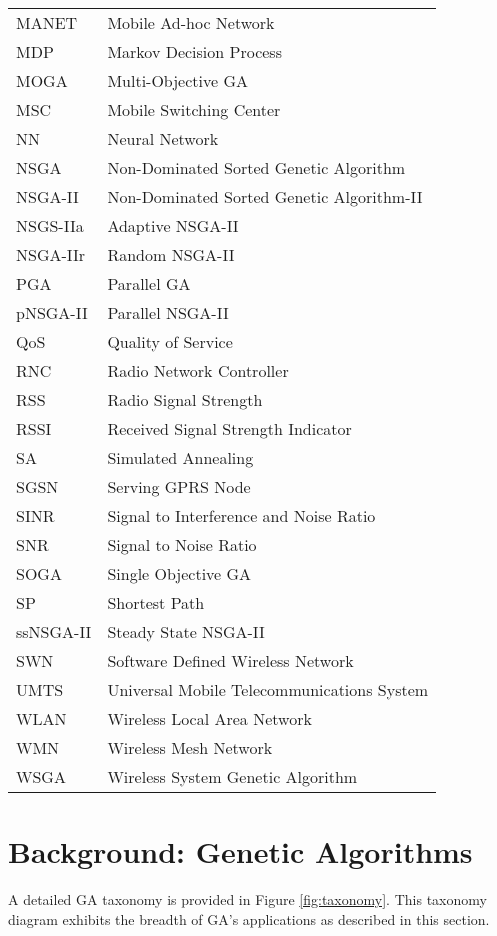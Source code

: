 \documentclass[journal]{IEEEtran}
\begin{document}
\begin{table}
\begin{tabular}{p{1.3cm}p{5.3cm}}
MANET   &   Mobile Ad-hoc Network\\
MDP  &  Markov Decision Process\\
MOGA  &  Multi-Objective GA\\
MSC  &  Mobile Switching Center\\
NN  &  Neural Network\\
NSGA  &  Non-Dominated Sorted Genetic Algorithm\\
NSGA-II  &  Non-Dominated Sorted Genetic Algorithm-II\\
NSGS-IIa  &  Adaptive NSGA-II\\
NSGA-IIr  &  Random NSGA-II\\
PGA & Parallel GA\\
pNSGA-II  &  Parallel NSGA-II\\
QoS  &  Quality of Service\\
RNC  &  Radio Network Controller \\
RSS   &   Radio Signal Strength\\
RSSI  &  Received Signal Strength Indicator\\
SA  &  Simulated Annealing\\
SGSN  &  Serving GPRS Node\\
SINR  &  Signal to Interference and Noise Ratio\\
SNR   &   Signal to Noise Ratio\\
SOGA  &  Single Objective GA\\
SP  &  Shortest Path\\
ssNSGA-II  &  Steady State NSGA-II\\
SWN &  Software Defined Wireless Network\\
UMTS   &   Universal Mobile Telecommunications System\\
WLAN  &  Wireless Local Area Network\\
WMN   &   Wireless Mesh Network\\
WSGA  &  Wireless System Genetic Algorithm\\

\bottomrule
\end{tabular}
\end{table}

\section{Background: Genetic Algorithms}
\label{sec:background}

A detailed GA taxonomy is provided in Figure \ref{fig:taxonomy}. This taxonomy diagram exhibits the breadth of GA's applications as described in this section.
\end{document}
